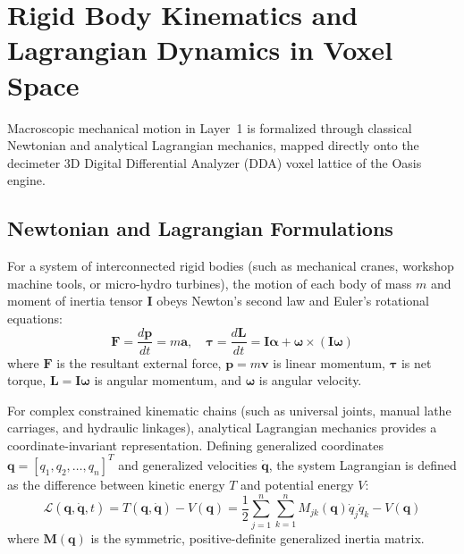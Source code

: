 \section{Rigid Body Kinematics and Lagrangian Dynamics in Voxel Space}
\label{sec:mech_lagrangian}

Macroscopic mechanical motion in Layer~1 is formalized through classical Newtonian and analytical Lagrangian mechanics, mapped directly onto the decimeter 3D Digital Differential Analyzer (DDA) voxel lattice of the Oasis engine.

\subsection{Newtonian and Lagrangian Formulations}
For a system of interconnected rigid bodies (such as mechanical cranes, workshop machine tools, or micro-hydro turbines), the motion of each body of mass $m$ and moment of inertia tensor $\mathbf{I}$ obeys Newton's second law and Euler's rotational equations:
\begin{equation}
\mathbf{F} = \frac{d\mathbf{p}}{dt} = m \mathbf{a}, \quad \boldsymbol{\tau} = \frac{d\mathbf{L}}{dt} = \mathbf{I}\boldsymbol{\alpha} + \boldsymbol{\omega} \times (\mathbf{I}\boldsymbol{\omega})
\label{eq:newton_euler_motion}
\end{equation}
where $\mathbf{F}$ is the resultant external force, $\mathbf{p} = m\mathbf{v}$ is linear momentum, $\boldsymbol{\tau}$ is net torque, $\mathbf{L} = \mathbf{I}\boldsymbol{\omega}$ is angular momentum, and $\boldsymbol{\omega}$ is angular velocity.

For complex constrained kinematic chains (such as universal joints, manual lathe carriages, and hydraulic linkages), analytical Lagrangian mechanics provides a coordinate-invariant representation. Defining generalized coordinates $\mathbf{q} = [q_1, q_2, \dots, q_n]^T$ and generalized velocities $\mathbf{\dot{q}}$, the system Lagrangian is defined as the difference between kinetic energy $T$ and potential energy $V$:
\begin{equation}
\mathcal{L}(\mathbf{q}, \mathbf{\dot{q}}, t) = T(\mathbf{q}, \mathbf{\dot{q}}) - V(\mathbf{q}) = \frac{1}{2} \sum_{j=1}^{n} \sum_{k=1}^{n} M_{jk}(\mathbf{q}) \dot{q}_j \dot{q}_k - V(\mathbf{q})
\label{eq:lagrangian_definition}
\end{equation}
where $\mathbf{M}(\mathbf{q})$ is the symmetric, positive-definite generalized inertia matrix. 

